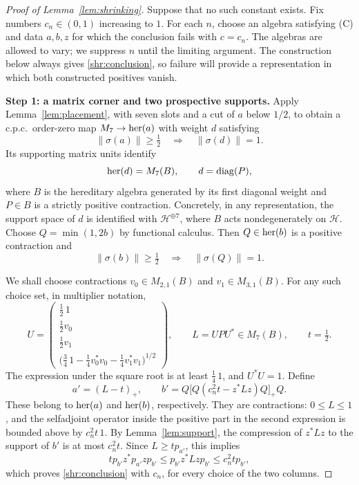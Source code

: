 \begin{proof}[Proof of Lemma~\ref{lem:shrinking}]
Suppose that no such constant exists.  Fix numbers $c_n\in(0,1)$ increasing
to $1$.  For each $n$, choose an algebra satisfying \textup{(C)} and data
$a,b,z$ for which the conclusion fails with $c=c_n$.  The algebras are
allowed to vary; we suppress $n$ until the limiting argument.  The
construction below always gives \eqref{shr:conclusion}, so failure will
provide a representation in which both constructed positives vanish.

\medskip
\noindent\textbf{Step 1: a matrix corner and two prospective supports.}
Apply Lemma~\ref{lem:placement}, with seven slots and a cut of $a$ below
$1/2$, to obtain a c.p.c.\ order-zero map $M_7\to\operatorname{her}(a)$ with weight $d$
satisfying
\begin{equation}\label{shr:d-visibility}
 \|\sigma(a)\|\ge\tfrac12\quad\Longrightarrow\quad\|\sigma(d)\|=1.
\end{equation}
Its supporting matrix units identify
\[
 \operatorname{her}(d)=M_7(B),\qquad d=\operatorname{diag}(P),
\]
where $B$ is the hereditary algebra generated by its first diagonal
weight and $P\in B$ is a strictly positive contraction.  Concretely, in
any representation, the support space of $d$ is identified with
$\mathcal H^{\oplus7}$, where $B$ acts nondegenerately on $\mathcal H$.
Choose $Q=\min(1,2b)$ by functional calculus.  Then $Q\in\operatorname{her}(b)$ is a
positive contraction and
\begin{equation}\label{shr:Q-visibility}
 \|\sigma(b)\|\ge\tfrac12\quad\Longrightarrow\quad\|\sigma(Q)\|=1.
\end{equation}

We shall choose contractions
$v_0\in M_{2,1}(B)$ and $v_1\in M_{3,1}(B)$.  For any such choice set,
in multiplier notation,
\begin{equation}\label{shr:U}
 U=\begin{pmatrix}
 \frac12\,1\\[2pt] \frac12 v_0\\[2pt] \frac12 v_1\\[2pt]
 \bigl(\frac34\,1-\frac14v_0^*v_0-\frac14v_1^*v_1\bigr)^{1/2}
 \end{pmatrix},\qquad
 L=UPU^*\in M_7(B),\qquad t=\tfrac12.
\end{equation}
The expression under the square root is at least $\frac14\,1$, and
$U^*U=1$.  Define
\begin{equation}\label{shr:ab-prime}
 a'=(L-t)_+,\qquad
 b'=Q\bigl[Q(c_n^2t-z^*Lz)Q\bigr]_+Q.
\end{equation}
These belong to $\operatorname{her}(a)$ and $\operatorname{her}(b)$, respectively.  They are
contractions: $0\le L\le1$, and the selfadjoint operator inside the positive
part in the second expression is bounded above by $c_n^2t\,1$.
By Lemma~\ref{lem:support}, the compression of $z^*Lz$ to the support of
$b'$ is at most $c_n^2t$.  Since $L\ge t p_{a'}$, this implies
\[
 t p_{b'}z^*p_{a'}z p_{b'}
 \le p_{b'}z^*Lz p_{b'}\le c_n^2t p_{b'},
\]
which proves \eqref{shr:conclusion} with $c_n$, for every choice of the two
columns.


\end{proof}
